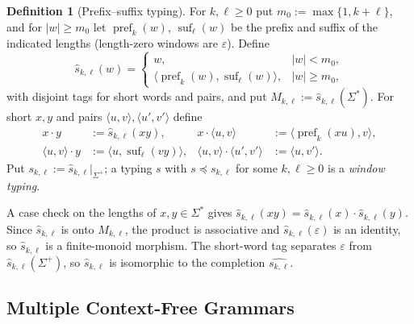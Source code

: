 \documentclass[11pt]{article}
\numberwithin{equation}{section}
\theoremstyle{plain}
\theoremstyle{definition}
\newtheorem{definition}[theorem]{Definition}
\theoremstyle{remark}
\newcommand{\eps}{\varepsilon}
\theoremstyle{plain}
\begin{document}
\begin{definition}[Prefix--suffix typing]
\label{def:prefix-suffix-typing}
For $k,\ell\ge0$ put $m_0:=\max\{1,k+\ell\}$, and for $|w|\ge m_0$ let
$\operatorname{pref}_k(w)$, $\operatorname{suf}_\ell(w)$ be the prefix and
suffix of the indicated lengths (length-zero windows are $\eps$).  Define
\[
 \widehat{s}_{k,\ell}(w)=
 \begin{cases}
   w, & |w|<m_0,\\
   \langle\operatorname{pref}_k(w),\operatorname{suf}_\ell(w)\rangle,
      & |w|\ge m_0,
 \end{cases}
\]
with disjoint tags for short words and pairs, and put
$M_{k,\ell}:=\widehat{s}_{k,\ell}(\Sigma^*)$.  For short $x,y$ and pairs
$\langle u,v\rangle,\langle u',v'\rangle$ define
\[
\begin{aligned}
 x\cdot y&:=\widehat{s}_{k,\ell}(xy), &
 x\cdot\langle u,v\rangle&:=\langle\operatorname{pref}_k(xu),v\rangle,\\
 \langle u,v\rangle\cdot y&:=\langle u,\operatorname{suf}_\ell(vy)\rangle, &
 \langle u,v\rangle\cdot\langle u',v'\rangle&:=\langle u,v'\rangle.
\end{aligned}
\]
Put $s_{k,\ell}:=\widehat{s}_{k,\ell}|_{\Sigma^+}$; a typing $s$ with
$s\preceq s_{k,\ell}$ for some $k,\ell\ge0$ is a \emph{window typing}.
\end{definition}

A case check on the lengths of $x,y\in\Sigma^*$ gives
$\widehat{s}_{k,\ell}(xy)=\widehat{s}_{k,\ell}(x)\cdot\widehat{s}_{k,\ell}(y)$.
Since $\widehat{s}_{k,\ell}$ is onto $M_{k,\ell}$, the product is associative
and $\widehat{s}_{k,\ell}(\eps)$ is an identity, so $\widehat{s}_{k,\ell}$ is a
finite-monoid morphism.  The short-word tag separates $\eps$ from
$\widehat{s}_{k,\ell}(\Sigma^+)$, so $\widehat{s}_{k,\ell}$ is isomorphic to the
completion $\widehat{s_{k,\ell}}$.

\subsection{Multiple Context-Free Grammars}
\end{document}

